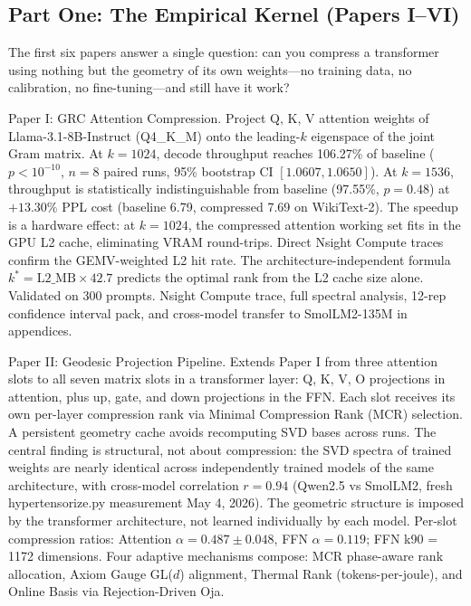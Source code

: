 \documentclass[11pt]{article}
\begin{document}
\subsection*{Part One: The Empirical Kernel (Papers I--VI)}

The first six papers answer a single question: can you compress a transformer using nothing but the geometry of its own weights---no training data, no calibration, no fine-tuning---and still have it work?

Paper I: GRC Attention Compression. Project Q, K, V attention weights of Llama-3.1-8B-Instruct (Q4\_K\_M) onto the leading-$k$ eigenspace of the joint Gram matrix. At $k=1024$, decode throughput reaches 106.27\% of baseline ($p < 10^{-10}$, $n=8$ paired runs, 95\% bootstrap CI $[1.0607, 1.0650]$). At $k=1536$, throughput is statistically indistinguishable from baseline (97.55\%, $p=0.48$) at $+13.30\%$ PPL cost (baseline 6.79, compressed 7.69 on WikiText-2). The speedup is a hardware effect: at $k=1024$, the compressed attention working set fits in the GPU L2 cache, eliminating VRAM round-trips. Direct Nsight Compute traces confirm the GEMV-weighted L2 hit rate. The architecture-independent formula $k^* = \mathrm{L2\_MB} \times 42.7$ predicts the optimal rank from the L2 cache size alone. Validated on 300 prompts. Nsight Compute trace, full spectral analysis, 12-rep confidence interval pack, and cross-model transfer to SmolLM2-135M in appendices.

Paper II: Geodesic Projection Pipeline. Extends Paper I from three attention slots to all seven matrix slots in a transformer layer: Q, K, V, O projections in attention, plus up, gate, and down projections in the FFN. Each slot receives its own per-layer compression rank via Minimal Compression Rank (MCR) selection. A persistent geometry cache avoids recomputing SVD bases across runs. The central finding is structural, not about compression: the SVD spectra of trained weights are nearly identical across independently trained models of the same architecture, with cross-model correlation $r = 0.94$ (Qwen2.5 vs SmolLM2, fresh hypertensorize.py measurement May 4, 2026). The geometric structure is imposed by the transformer architecture, not learned individually by each model. Per-slot compression ratios: Attention $\alpha = 0.487 \pm 0.048$, FFN $\alpha = 0.119$; FFN k90 = 1172 dimensions. Four adaptive mechanisms compose: MCR phase-aware rank allocation, Axiom Gauge GL($d$) alignment, Thermal Rank (tokens-per-joule), and Online Basis via Rejection-Driven Oja.
\end{document}
